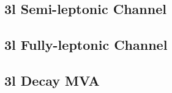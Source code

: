  
\subsection{ 3l Semi-leptonic Channel}                                                                            
\label{subsec:pt3lS}                                                                                                    



 
\subsection{ 3l Fully-leptonic Channel}                                                                            
\label{subsec:pt3lF}                                                                                                    




\subsection{3l Decay MVA}
\label{subsec:decayMVA}



